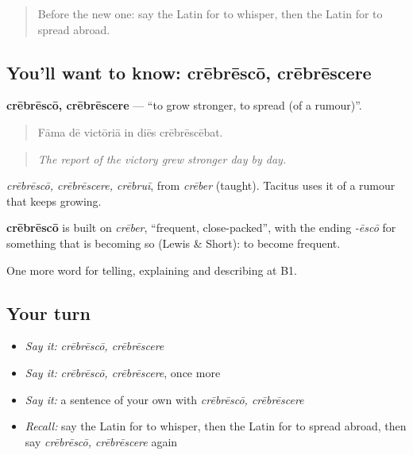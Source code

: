 \begin{quote}
Before the new one: say the Latin for to whisper, then the Latin for to spread abroad.
\end{quote}

\subsection*{You'll want to know: crēbrēscō, crēbrēscere}
\textbf{crēbrēscō, crēbrēscere} — \textquotedblleft{}to grow stronger, to spread (of a rumour)\textquotedblright{}.

\begin{quote}
Fāma dē victōriā in diēs crēbrēscēbat.
\end{quote}

\begin{quote}
\emph{The report of the victory grew stronger day by day.}
\end{quote}

\emph{crēbrēscō, crēbrēscere, crēbruī}, from \emph{crēber} (taught). Tacitus uses it of a rumour that keeps growing.

\begin{cousinweb}
\textbf{crēbrēscō} is built on \emph{crēber}, \textquotedblleft{}frequent, close-packed\textquotedblright{}, with the ending \emph{-ēscō} for something that is becoming so (Lewis \& Short): to become frequent.
\end{cousinweb}

\begin{grammarlens}[title={What you've built}]
One more word for telling, explaining and describing at B1.
\end{grammarlens}

\subsection*{Your turn}
\begin{itemize}
\raggedright
  \item \emph{Say it:} \emph{crēbrēscō, crēbrēscere}
  \item \emph{Say it:} \emph{crēbrēscō, crēbrēscere}, once more
  \item \emph{Say it:} a sentence of your own with \emph{crēbrēscō, crēbrēscere}
  \item \emph{Recall:} say the Latin for to whisper, then the Latin for to spread abroad, then say \emph{crēbrēscō, crēbrēscere} again
\end{itemize}

